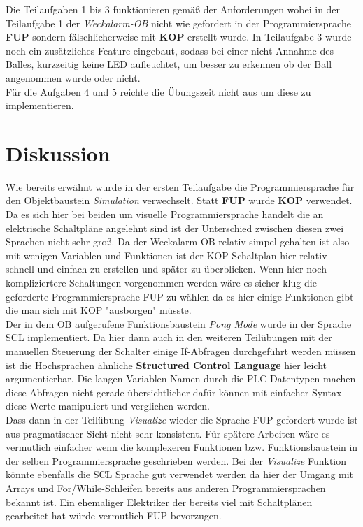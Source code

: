 \documentclass[a4paper]{article}
\begin{document}
      Die Teilaufgaben 1 bis 3 funktionieren gemäß der Anforderungen wobei in der Teilaufgabe 1 der \textit{Weckalarm-OB} nicht wie gefordert in der Programmiersprache \textbf{FUP} sondern fälschlicherweise mit \textbf{KOP} erstellt wurde. In Teilaufgabe 3 wurde noch ein zusätzliches Feature eingebaut, sodass bei einer nicht Annahme des Balles, kurzzeitig keine LED aufleuchtet, um besser zu erkennen ob der Ball angenommen wurde oder nicht.\\
      Für die Aufgaben 4 und 5 reichte die Übungszeit nicht aus um diese zu implementieren.

    \section{Diskussion}

    Wie bereits erwähnt wurde in der ersten Teilaufgabe die Programmiersprache für den Objektbaustein \textit{Simulation} verwechselt. Statt \textbf{FUP} wurde \textbf{KOP} verwendet. Da es sich hier bei beiden um visuelle Programmiersprache handelt die an elektrische Schaltpläne angelehnt sind ist der Unterschied zwischen diesen zwei Sprachen nicht sehr groß. Da der Weckalarm-OB relativ simpel gehalten ist also mit wenigen Variablen und Funktionen ist der KOP-Schaltplan hier relativ schnell und einfach zu erstellen und später zu überblicken. Wenn hier noch kompliziertere Schaltungen vorgenommen werden wäre es sicher klug die geforderte Programmiersprache FUP zu wählen da es hier einige Funktionen gibt die man sich mit KOP "ausborgen" müsste. \\ 
    Der in dem OB aufgerufene Funktionsbaustein \textit{Pong Mode} wurde in der Sprache SCL implementiert. Da hier dann auch in den weiteren Teilübungen mit der manuellen Steuerung der Schalter einige If-Abfragen durchgeführt werden müssen ist die Hochsprachen ähnliche \textbf{Structured Control Language} hier leicht argumentierbar. Die langen Variablen Namen durch die PLC-Datentypen machen diese Abfragen nicht gerade übersichtlicher dafür können mit einfacher Syntax diese Werte manipuliert und verglichen werden. \\ Dass dann in der Teilübung \textit{Visualize} wieder die Sprache FUP gefordert wurde ist aus pragmatischer Sicht nicht sehr konsistent. Für spätere Arbeiten wäre es vermutlich einfacher wenn die komplexeren Funktionen bzw. Funktionsbaustein in der selben Programmiersprache geschrieben werden. Bei der \textit{Visualize} Funktion könnte ebenfalls die SCL Sprache gut verwendet werden da hier der Umgang mit Arrays und For/While-Schleifen bereits aus anderen Programmiersprachen bekannt ist. Ein ehemaliger Elektriker der bereits viel mit Schaltplänen gearbeitet hat würde vermutlich  FUP bevorzugen.

    \newpage
    \listoffigures
    \listoftables
\end{document}
